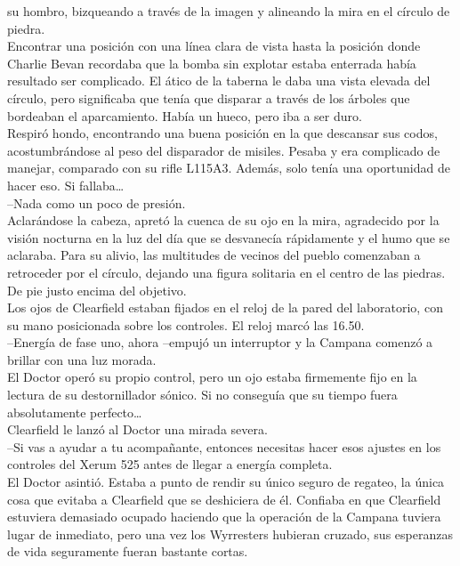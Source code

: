 su hombro, bizqueando a través de la imagen y alineando la mira en el
círculo de piedra.\\
Encontrar una posición con una línea clara de vista hasta la posición
donde Charlie Bevan recordaba que la bomba sin explotar estaba enterrada
había resultado ser complicado. El ático de la taberna le daba una vista
elevada del círculo, pero significaba que tenía que disparar a través de
los árboles que bordeaban el aparcamiento. Había un hueco, pero iba a
ser duro.\\
Respiró hondo, encontrando una buena posición en la que descansar sus
codos, acostumbrándose al peso del disparador de misiles. Pesaba y era
complicado de manejar, comparado con su rifle L115A3. Además, solo tenía
una oportunidad de hacer eso. Si fallaba\ldots{}\\
--Nada como un poco de presión.\\
Aclarándose la cabeza, apretó la cuenca de su ojo en la mira, agradecido
por la visión nocturna en la luz del día que se desvanecía rápidamente y
el humo que se aclaraba. Para su alivio, las multitudes de vecinos del
pueblo comenzaban a retroceder por el círculo, dejando una figura
solitaria en el centro de las piedras.\\
De pie justo encima del objetivo.\\[2\baselineskip]Los ojos de
Clearfield estaban fijados en el reloj de la pared del laboratorio, con
su mano posicionada sobre los controles. El reloj marcó las 16.50.\\
--Energía de fase uno, ahora --empujó un interruptor y la Campana
comenzó a brillar con una luz morada.\\
El Doctor operó su propio control, pero un ojo estaba firmemente fijo en
la lectura de su destornillador sónico. Si no conseguía que su tiempo
fuera absolutamente perfecto\ldots{}\\
Clearfield le lanzó al Doctor una mirada severa.\\
--Si vas a ayudar a tu acompañante, entonces necesitas hacer esos
ajustes en los controles del Xerum 525 antes de llegar a energía
completa.\\
El Doctor asintió. Estaba a punto de rendir su único seguro de regateo,
la única cosa que evitaba a Clearfield que se deshiciera de él. Confiaba
en que Clearfield estuviera demasiado ocupado haciendo que la operación
de la Campana tuviera lugar de inmediato, pero una vez los Wyrresters
hubieran cruzado, sus esperanzas de vida seguramente fueran bastante
cortas.\\
